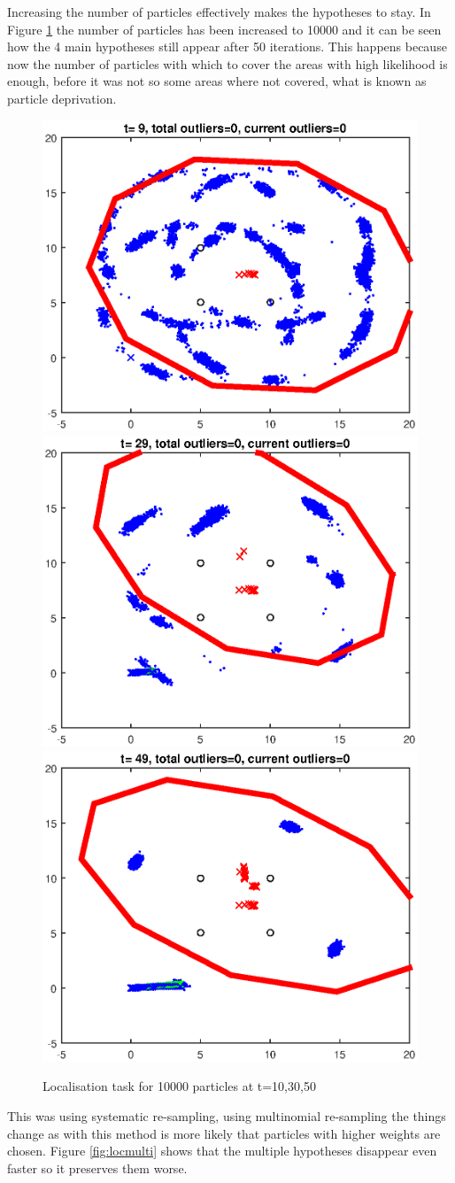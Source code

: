 \documentclass[12pt]{article}
\begin{document}
Increasing the number of particles effectively makes the hypotheses to stay. In Figure \ref{fig:loc10000} the number of particles has been increased to 10000 and it can be seen how the 4 main hypotheses still appear after 50 iterations. This happens because now the number of particles with which to cover the areas with high likelihood is enough, before it was not so some areas where not covered, what is known as particle deprivation.\\

\begin{figure}[htp]

\centering
\includegraphics[width=.3\textwidth]{sym2loc10000_t10}\hfill
\includegraphics[width=.3\textwidth]{sym2loc10000_t30}\hfill
\includegraphics[width=.3\textwidth]{sym2loc10000_t50}

\caption{Localisation task for 10000 particles at t=10,30,50}
\label{fig:loc10000}

\end{figure}

This was using systematic re-sampling, using multinomial re-sampling the things change as with this method is more likely that particles with higher weights are chosen. Figure \ref{fig:locmulti} shows that the multiple hypotheses disappear even faster so it preserves them worse.\\
\end{document}
